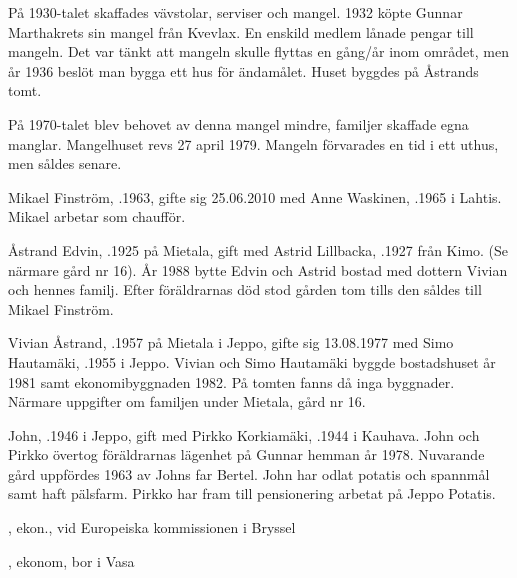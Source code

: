 På 1930-talet skaffades vävstolar, serviser och mangel. 1932 köpte Gunnar Marthakrets sin mangel från Kvevlax. En enskild medlem lånade pengar till mangeln. Det var tänkt att mangeln skulle flyttas en gång/år inom området, men år 1936 beslöt man bygga ett hus för ändamålet. Huset byggdes på Åstrands tomt.

På 1970-talet blev behovet av denna mangel mindre, familjer skaffade egna manglar. Mangelhuset revs 27 april 1979. Mangeln förvarades en tid i ett uthus, men såldes senare.



%



%
Mikael Finström, .1963, gifte sig 25.06.2010 med Anne Waskinen, .1965 i Lahtis. Mikael arbetar som chaufför.\jhvspace{}


%
Åstrand Edvin, .1925 på Mietala, gift med Astrid Lillbacka, .1927 från Kimo. (Se närmare gård nr 16). År 1988 bytte Edvin och Astrid bostad med dottern Vivian och hennes familj. Efter föräldrarnas död stod gården tom tills den såldes till Mikael Finström.


%
Vivian Åstrand, .1957  på Mietala i Jeppo, gifte sig 13.08.1977 med Simo Hautamäki, .1955 i Jeppo. Vivian och Simo Hautamäki byggde bostadshuset år 1981 samt ekonomibyggnaden 1982. På tomten fanns då inga byggnader. Närmare uppgifter om familjen under Mietala, gård nr 16.



%



%
John, .1946 i Jeppo, gift med Pirkko Korkiamäki, .1944 i Kauhava. John och Pirkko övertog föräldrarnas lägenhet på Gunnar hemman år 1978. Nuvarande gård uppfördes 1963 av Johns far Bertel. John har odlat potatis och spannmål samt haft pälsfarm. Pirkko har fram till pensionering arbetat på Jeppo Potatis.
\begin{jhchildren}
  \item {}, ekon., vid Europeiska kommissionen i Bryssel
  \item {}, ekonom, bor i Vasa
\end{jhchildren}



